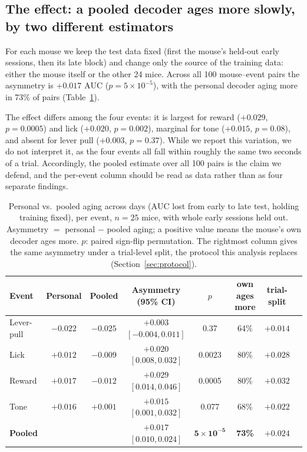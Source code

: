 \documentclass{article}
\newcommand{\auc}{\mathrm{AUC}}
\begin{document}
\subsection{The effect: a pooled decoder ages more slowly, by two different estimators}
\label{sec:asym}
\label{sec:decay}
For each mouse we keep the test data fixed (first the mouse's held-out early sessions, then its late
block) and change only the source of the training data: either the mouse itself or the other 24 mice.
Across all 100 mouse--event pairs the asymmetry is $+0.017$ $\auc$ ($p = 5 \times 10^{-5}$), with the
personal decoder aging more in 73\% of pairs (Table~\ref{tab:asym}).

The effect differs among the four events: it is largest for reward ($+0.029$, $p = 0.0005$) and lick
($+0.020$, $p = 0.002$), marginal for tone ($+0.015$, $p = 0.08$), and absent for lever pull
($+0.003$, $p = 0.37$). While we report this variation, we do not interpret it, as the four events
all fall within roughly the same two seconds of a trial. Accordingly, the pooled estimate over all
100 pairs is the claim we defend, and the per-event column should be read as data rather than as
four separate findings.

\begin{table}[t]\centering
\caption{Personal vs.\ pooled aging across days ($\auc$ lost from early to late test, holding
training fixed), per event, $n = 25$ mice, with whole early sessions held out. Asymmetry $=$
personal $-$ pooled aging; a positive value means the mouse's own decoder ages more. $p$: paired
sign-flip permutation. The rightmost column gives the same asymmetry under a trial-level split, the
protocol this analysis replaces (Section~\ref{sec:protocol}).}
\label{tab:asym}
\setlength{\tabcolsep}{4pt}
\begin{tabular}{lccccccc}
\toprule
Event & Personal & Pooled & Asymmetry (95\% CI) & $p$ & own ages more & trial-split \\
\midrule
Lever-pull & $-0.022$ & $-0.025$ & $+0.003$ $[-0.004, 0.011]$ & 0.37 & 64\% & $+0.014$ \\
Lick       & $+0.012$ & $-0.009$ & $+0.020$ $[0.008, 0.032]$ & 0.0023 & 80\% & $+0.028$ \\
Reward     & $+0.017$ & $-0.012$ & $+0.029$ $[0.014, 0.046]$ & 0.0005 & 80\% & $+0.032$ \\
Tone       & $+0.016$ & $+0.001$ & $+0.015$ $[0.001, 0.032]$ & 0.077 & 68\% & $+0.022$ \\
\midrule
\textbf{Pooled} & & & $\mathbf{+0.017}$ $[0.010, 0.024]$ & $\mathbf{5\times10^{-5}}$ & \textbf{73\%} & $+0.024$ \\
\bottomrule
\end{tabular}
\end{table}
\end{document}
